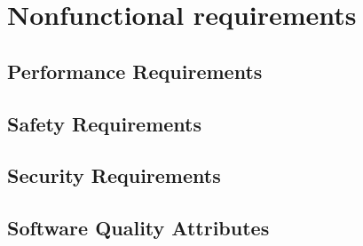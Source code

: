 
\section{Nonfunctional requirements}

\subsection{Performance Requirements}
\subsection{Safety Requirements}
\subsection{Security Requirements}
\subsection{Software Quality Attributes}
